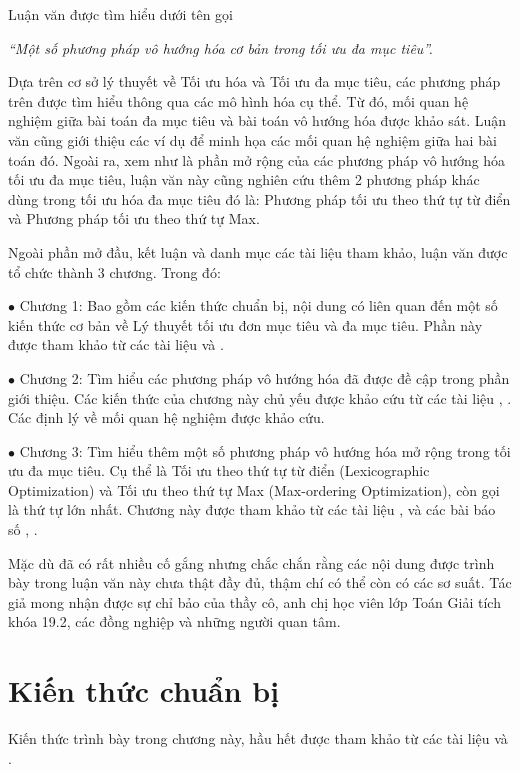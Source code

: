 \documentclass[12pt,a4paper]{report}
\begin{document}
Luận văn được tìm hiểu dưới tên gọi

{\it ``Một số phương pháp vô hướng hóa cơ bản trong tối ưu đa mục tiêu''.}


Dựa trên cơ sở lý thuyết về Tối ưu hóa và Tối ưu đa mục tiêu, các phương pháp trên được tìm hiểu thông qua các  mô hình hóa  cụ thể. Từ đó,  mối quan hệ nghiệm giữa bài toán đa mục tiêu và bài toán vô hướng  hóa được khảo sát. Luận văn cũng giới thiệu các ví dụ để minh họa các mối quan hệ nghiệm giữa hai bài toán đó. Ngoài ra, xem như là phần mở rộng của các phương pháp vô hướng hóa tối ưu đa mục tiêu, luận văn này cũng nghiên cứu thêm 2 phương pháp khác dùng trong tối ưu hóa đa mục tiêu đó là: Phương pháp tối ưu theo thứ tự từ điển và Phương pháp tối ưu theo thứ tự Max.





 Ngoài phần mở đầu, kết luận và danh mục các tài liệu tham khảo, luận văn được tổ chức thành 3 chương. Trong đó: 

$\bullet$ Chương 1: Bao gồm các kiến thức chuẩn bị, nội dung có liên quan đến một số kiến thức cơ bản về Lý thuyết tối ưu đơn mục tiêu và  đa mục tiêu. Phần này được tham khảo từ các tài liệu  \cite{Son1} và \cite{Son2}.

$\bullet$ Chương 2: Tìm hiểu các phương pháp vô hướng hóa đã được đề cập trong phần giới thiệu. Các kiến thức của chương này chủ yếu được khảo cứu từ các tài liệu \cite{Mat}, \cite{Joel}. Các định lý về mối quan hệ nghiệm được khảo cứu.

$\bullet$ Chương 3: Tìm hiểu thêm một số phương pháp vô hướng hóa mở rộng trong  tối ưu đa mục tiêu. Cụ thể là Tối ưu theo thứ tự từ điển (Lexicographic Optimization) và Tối ưu theo thứ tự Max (Max-ordering Optimization), còn gọi là thứ tự lớn nhất. Chương này được tham khảo từ các tài liệu \cite{Mat}, \cite{Flou} và các bài báo số \cite{Gab1}, \cite{Gian}.

	Mặc dù đã có rất nhiều cố gắng nhưng chắc chắn rằng các nội dung được trình bày trong luận văn này chưa thật đầy đủ, thậm chí có thể còn có các sơ suất. Tác giả mong nhận được sự chỉ bảo của thầy cô, anh chị học viên lớp Toán Giải tích khóa 19.2, các đồng nghiệp và những người quan tâm.






\newpage
\renewcommand{\baselinestretch}{1.2}
 
\chapter{Kiến thức chuẩn bị} 
Kiến thức trình bày trong chương này, hầu hết được tham khảo từ các tài liệu  \cite{Mat} và \cite{Gab1}.
\end{document}
